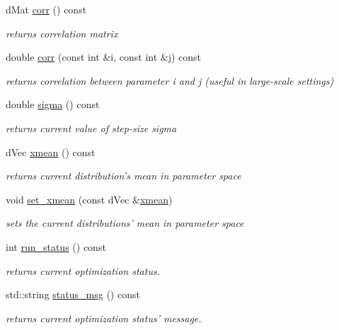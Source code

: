 \begin{DoxyCompactItemize}
\item 
d\+Mat \hyperlink{classlibcmaes_1_1CMASolutions_a9f90cb5d6ec89d4327e08a564a06b988}{corr} () const 
\begin{DoxyCompactList}\small\item\em returns correlation matrix \end{DoxyCompactList}\item 
double \hyperlink{classlibcmaes_1_1CMASolutions_a758fa2e0cd330c978383ed1bdc39d877}{corr} (const int \&i, const int \&j) const 
\begin{DoxyCompactList}\small\item\em returns correlation between parameter i and j (useful in large-\/scale settings) \end{DoxyCompactList}\item 
double \hyperlink{classlibcmaes_1_1CMASolutions_a8790ac429e629856d2295e953cbe2324}{sigma} () const 
\begin{DoxyCompactList}\small\item\em returns current value of step-\/size sigma \end{DoxyCompactList}\item 
d\+Vec \hyperlink{classlibcmaes_1_1CMASolutions_ab8d63d0079eff716421f82a8ec874ca4}{xmean} () const 
\begin{DoxyCompactList}\small\item\em returns current distribution's mean in parameter space \end{DoxyCompactList}\item 
void \hyperlink{classlibcmaes_1_1CMASolutions_a743993dedaaf9adc7cb60cb65e584721}{set\+\_\+xmean} (const d\+Vec \&\hyperlink{classlibcmaes_1_1CMASolutions_ab8d63d0079eff716421f82a8ec874ca4}{xmean})
\begin{DoxyCompactList}\small\item\em sets the current distributions' mean in parameter space \end{DoxyCompactList}\item 
int \hyperlink{classlibcmaes_1_1CMASolutions_a4215c5baf357d23ef893eb52b4766eea}{run\+\_\+status} () const 
\begin{DoxyCompactList}\small\item\em returns current optimization status. \end{DoxyCompactList}\item 
std\+::string \hyperlink{classlibcmaes_1_1CMASolutions_a2a255d59c7e139109781cef8f5d94c38}{status\+\_\+msg} () const 
\begin{DoxyCompactList}\small\item\em returns current optimization status' message. \end{DoxyCompactList}\item 

\end{DoxyCompactItemize}

